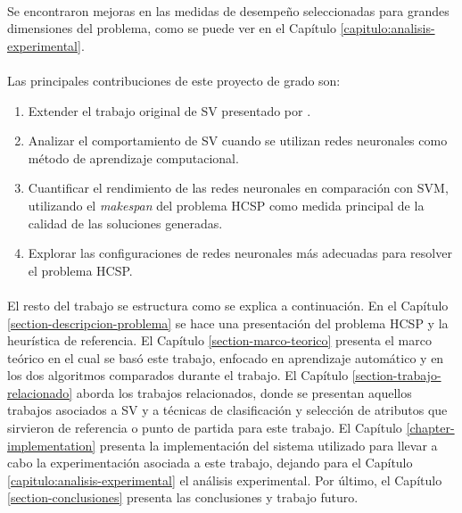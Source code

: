\paragraph{} Se encontraron mejoras en las medidas de desempeño seleccionadas para grandes dimensiones del problema, como se puede ver en el Capítulo \ref{capitulo:analisis-experimental}.

\paragraph{}Las principales contribuciones de este proyecto de grado son:
\begin{enumerate}
    \item Extender el trabajo original de SV presentado por \citet{savant-original}.
    \item Analizar el comportamiento de SV cuando se utilizan redes neuronales como método de aprendizaje computacional.
    \item Cuantificar el rendimiento de las redes neuronales en comparación con SVM, utilizando el \textit{makespan} del problema HCSP como medida principal de la calidad de las soluciones generadas.
    \item Explorar las configuraciones de redes neuronales más adecuadas para resolver el problema HCSP.
\end{enumerate}

\paragraph{} El resto del trabajo se estructura como se explica a continuación.
En el Capítulo \ref{section-descripcion-problema} se hace una presentación del problema HCSP y la heurística de referencia. El Capítulo \ref{section-marco-teorico} presenta el marco teórico en el cual se basó este trabajo, enfocado en aprendizaje automático y en los dos algoritmos comparados durante el trabajo.
El Capítulo \ref{section-trabajo-relacionado} aborda los trabajos relacionados, donde se presentan aquellos trabajos asociados a SV y a técnicas de clasificación y selección de atributos que sirvieron de referencia o punto de partida para este trabajo.
El Capítulo \ref{chapter-implementation} presenta la implementación del sistema utilizado para llevar a cabo la experimentación asociada a este trabajo, dejando para el Capítulo \ref{capitulo:analisis-experimental} el análisis experimental.
Por último, el Capítulo \ref{section-conclusiones} presenta las conclusiones y trabajo futuro.
